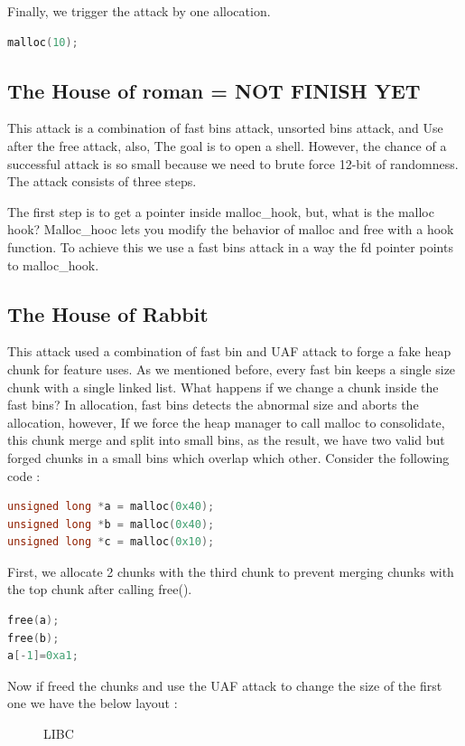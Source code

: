 \documentclass{masterthesis}
\newcommand*\fb{fast bins}
\newcommand*\ub{unsorted bins}
\newcommand*\sbs{small bins}
\begin{document}
Finally, we trigger the attack by one allocation. 
\begin{lstlisting}[language=c,frame=tlrb]
 malloc(10);
\end{lstlisting}

\subsection{The House of roman = NOT FINISH YET}
This attack is a combination of \fb{} attack, \ub{} attack, and Use after the free attack, also, The goal is to open a shell. However, the chance of a successful attack is so small because we need to brute force 12-bit of randomness. The attack consists of three steps.

The first step is to get a pointer inside malloc\_hook, but, what is the malloc hook? Malloc\_hooc lets you modify the behavior of malloc and free with a hook function. To achieve this we use a \fb{} attack in a way the fd pointer points to malloc\_hook.

\subsection{The House of Rabbit}

This attack used a combination of fast bin and UAF attack to forge a fake heap chunk for feature uses. As we mentioned before, every fast bin keeps a single size chunk with a single linked list. What happens if we change a chunk inside the \fb{}? In allocation, \fb{} detects the abnormal size and aborts the allocation, however, If we force the heap manager to call malloc to consolidate, this chunk merge and split into \sbs{}, as the result, we have two valid but forged chunks in a \sbs{} which overlap which other. Consider the following code : 
\begin{lstlisting}[language=c,frame=tlrb]
unsigned long *a = malloc(0x40);
unsigned long *b = malloc(0x40);
unsigned long *c = malloc(0x10);
\end{lstlisting}

First, we allocate 2 chunks with the third chunk to prevent merging chunks with the top chunk after calling free(). 

\begin{lstlisting}[language=c,frame=tlrb]
free(a);
free(b);
a[-1]=0xa1;
\end{lstlisting}
Now if freed the chunks and use the UAF attack to change the size of the first one we have the below layout :
\begin{figure}[h!]
  \caption{LIBC}
\end{figure}
\end{document}
